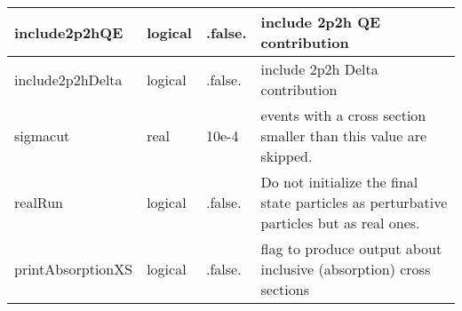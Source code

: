 \documentclass{article}
\begin{document}
\begin{longtable}{llll}
\midrule
include2p2hQE & \begin{minipage}[t]{2cm}logical\end{minipage} & \begin{minipage}[t]{2cm}.false.\end{minipage} & \begin{minipage}[t]{12cm}include 2p2h QE contribution\end{minipage}\\*
\midrule
include2p2hDelta & \begin{minipage}[t]{2cm}logical\end{minipage} & \begin{minipage}[t]{2cm}.false.\end{minipage} & \begin{minipage}[t]{12cm}include 2p2h Delta contribution\end{minipage}\\*
\midrule
sigmacut & \begin{minipage}[t]{2cm}real\end{minipage} & \begin{minipage}[t]{2cm}10e-4\end{minipage} & \begin{minipage}[t]{12cm}events with a cross section smaller than this value are skipped.\end{minipage}\\*
\midrule
realRun & \begin{minipage}[t]{2cm}logical\end{minipage} & \begin{minipage}[t]{2cm}.false.\end{minipage} & \begin{minipage}[t]{12cm}Do not initialize the final state particles as perturbative particles but as real ones.\end{minipage}\\*
\midrule
printAbsorptionXS & \begin{minipage}[t]{2cm}logical\end{minipage} & \begin{minipage}[t]{2cm}.false.\end{minipage} & \begin{minipage}[t]{12cm}flag to produce output about inclusive (absorption) cross sections\end{minipage}\\*
\midrule

\end{longtable}
\end{document}
